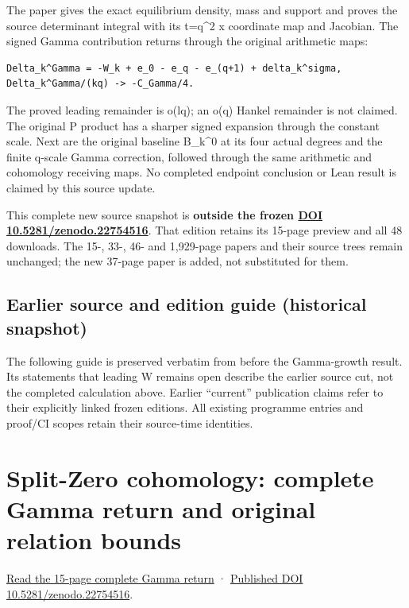\documentclass[
]{article}
\begin{document}
The paper gives the exact equilibrium density, mass and support and
proves the source determinant integral with its t=q\^{}2 x coordinate
map and Jacobian. The signed Gamma contribution returns through the
original arithmetic maps:

\begin{verbatim}
Delta_k^Gamma = -W_k + e_0 - e_q - e_(q+1) + delta_k^sigma,
Delta_k^Gamma/(kq) -> -C_Gamma/4.
\end{verbatim}

The proved leading remainder is o(lq); an o(q) Hankel remainder is not
claimed. The original P product has a sharper signed expansion through
the constant scale. Next are the original baseline B\_k\^{}0 at its four
actual degrees and the finite q-scale Gamma correction, followed through
the same arithmetic and cohomology receiving maps. No completed endpoint
conclusion or Lean result is claimed by this source update.

This complete new source snapshot is \textbf{outside the frozen
\href{https://doi.org/10.5281/zenodo.22754516}{DOI
10.5281/zenodo.22754516}}. That edition retains its 15-page preview and
all 48 downloads. The 15-, 33-, 46- and 1,929-page papers and their
source trees remain unchanged; the new 37-page paper is added, not
substituted for them.

\subsection{Earlier source and edition guide (historical
snapshot)}\label{earlier-source-and-edition-guide-historical-snapshot-20}

The following guide is preserved verbatim from before the Gamma-growth
result. Its statements that leading W remains open describe the earlier
source cut, not the completed calculation above. Earlier ``current''
publication claims refer to their explicitly linked frozen editions. All
existing programme entries and proof/CI scopes retain their source-time
identities.

\section{Split-Zero cohomology: complete Gamma return and original
relation
bounds}\label{split-zero-cohomology-complete-gamma-return-and-original-relation-bounds}

\href{https://zenodo.org/api/records/22754516/files/47-complete-gamma-return-reader.pdf/content}{Read
the 15-page complete Gamma return} ·
\href{https://doi.org/10.5281/zenodo.22754516}{Published DOI
10.5281/zenodo.22754516}.
\end{document}
